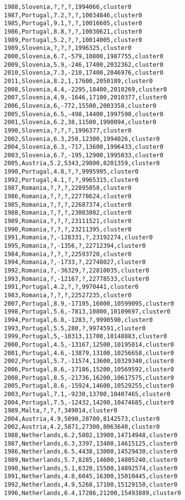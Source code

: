 \begin{lstlisting}[basicstyle=\footnotesize\ttfamily,numbers=none]
1988,Slovenia,?,?,?,1994066,cluster0
1987,Portugal,7.2,?,?,10034846,cluster0
1985,Portugal,9.1,?,?,10016605,cluster0
1986,Portugal,8.8,?,?,10030621,cluster0
1989,Portugal,5.2,?,?,10014005,cluster0
1989,Slovenia,?,?,?,1996325,cluster0
2000,Slovenia,6.7,-579,10800,1987755,cluster0
2009,Slovenia,5.9,-246,17400,2032362,cluster0
2010,Slovenia,7.3,-210,17400,2046976,cluster0
2011,Slovenia,8.2,1,17600,2050189,cluster0
2008,Slovenia,4.4,-2295,18400,2010269,cluster0
2007,Slovenia,4.9,-1646,17100,2010377,cluster0
2006,Slovenia,6,-772,15500,2003358,cluster0
2005,Slovenia,6.5,-498,14400,1997590,cluster0
2001,Slovenia,6.2,38,11500,1990094,cluster0
1990,Slovenia,?,?,?,1996377,cluster0
2002,Slovenia,6.3,250,12300,1994026,cluster0
2004,Slovenia,6.3,-717,13600,1996433,cluster0
2003,Slovenia,6.7,-195,12900,1995033,cluster0
2005,Austria,5.2,5343,29800,8201359,cluster0
1990,Portugal,4.8,?,?,9995995,cluster0
1992,Portugal,4.1,?,?,9965315,cluster0
1987,Romania,?,?,?,22895058,cluster0
1986,Romania,?,?,?,22778624,cluster0
1985,Romania,?,?,?,22687374,cluster0
1988,Romania,?,?,?,23003802,cluster0
1989,Romania,?,?,?,23111521,cluster0
1990,Romania,?,?,?,23211395,cluster0
1991,Romania,?,-128331,?,23192274,cluster0
1995,Romania,?,-1356,?,22712394,cluster0
1984,Romania,?,?,?,22593720,cluster0
1994,Romania,?,-1733,?,22748027,cluster0
1992,Romania,?,-36329,?,22810035,cluster0
1993,Romania,?,-12167,?,22778533,cluster0
1991,Portugal,4.2,?,?,9970441,cluster0
1983,Romania,?,?,?,22527235,cluster0
2007,Portugal,8.9,-17105,16000,10599095,cluster0
1998,Portugal,5.6,-7813,10800,10109697,cluster0
1994,Portugal,6.8,-1283,?,9990590,cluster0
1993,Portugal,5.5,280,?,9974591,cluster0
1999,Portugal,5,-10313,11700,10148883,cluster0
2000,Portugal,4.5,-13167,12500,10195014,cluster0
2001,Portugal,4.6,-13879,13100,10256658,cluster0
2002,Portugal,5.7,-11574,13600,10329340,cluster0
2006,Portugal,8.6,-17186,15200,10569592,cluster0
2008,Portugal,8.5,-21736,16200,10617575,cluster0
2005,Portugal,8.6,-15924,14600,10529255,cluster0
2003,Portugal,7.1,-9230,13700,10407465,cluster0
2004,Portugal,7.5,-12432,14200,10474685,cluster0
1989,Malta,?,?,?,349014,cluster0
2004,Austria,4.9,5090,28700,8142573,cluster0
2002,Austria,4.2,5871,27300,8063640,cluster0
1988,Netherlands,6.2,5802,13900,14714948,cluster0
1987,Netherlands,6.3,3397,13400,14615125,cluster0
1986,Netherlands,6.5,4438,13000,14529430,cluster0
1989,Netherlands,5.7,8285,14600,14805240,cluster0
1990,Netherlands,5.1,6320,15500,14892574,cluster0
1991,Netherlands,4.8,6045,16300,15010445,cluster0
1992,Netherlands,4.9,5268,17100,15129150,cluster0
1996,Netherlands,6.4,17286,21200,15493889,cluster0

\end{lstlisting}
